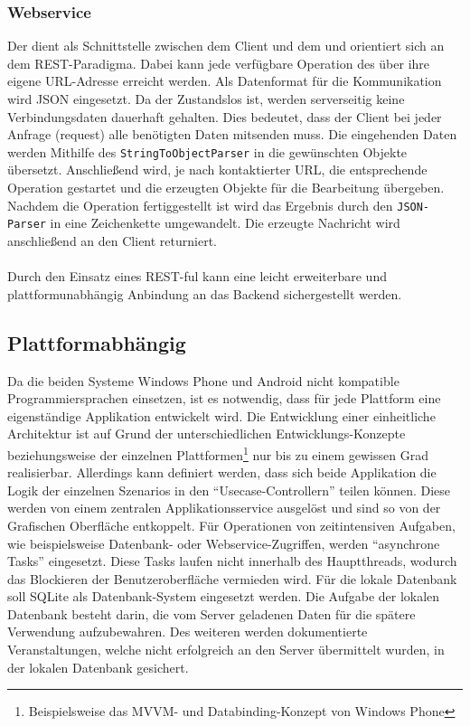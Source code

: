 \documentclass[Bachelorarbeit.tex]{subfiles}
\begin{document}
\subsubsection*{Webservice}
\label{subsub:webservice}
Der  dient als Schnittstelle zwischen dem Client und dem  und orientiert sich an dem \ac{REST}-Paradigma. 
Dabei kann jede verfügbare Operation des  über ihre eigene \ac{URL}-Adresse erreicht werden.
Als Datenformat für die Kommunikation wird \ac{JSON} eingesetzt.
Da der  Zustandslos ist, werden serverseitig keine Verbindungsdaten dauerhaft gehalten.
Dies bedeutet, dass der Client bei jeder Anfrage (request) alle benötigten Daten mitsenden muss.
Die eingehenden Daten werden Mithilfe des \texttt{StringToObjectParser} in die gewünschten Objekte übersetzt.
Anschließend wird, je nach kontaktierter \ac{URL}, die entsprechende Operation gestartet und die erzeugten Objekte für die Bearbeitung übergeben.
Nachdem die Operation fertiggestellt ist wird das Ergebnis durch den \texttt{\ac{JSON}-Parser} in eine Zeichenkette umgewandelt. 
Die erzeugte Nachricht wird anschließend an den Client returniert. \\
\\
Durch den Einsatz eines \ac{REST}-ful  kann eine leicht erweiterbare und plattformunabhängig Anbindung an das Backend sichergestellt werden.

\subsection*{Plattformabhängig}
Da die beiden Systeme Windows Phone und Android nicht kompatible Programmiersprachen einsetzen, ist es notwendig, dass für jede Plattform eine eigenständige Applikation entwickelt wird. 
Die Entwicklung einer einheitliche Architektur ist auf Grund der unterschiedlichen Entwicklungs-Konzepte beziehungsweise der einzelnen Plattformen\footnote{Beispielsweise das \ac{MVVM}- und Databinding-Konzept von Windows Phone} nur bis zu einem gewissen Grad realisierbar. 
Allerdings kann definiert werden, dass sich beide Applikation die Logik der einzelnen Szenarios in den "`Usecase-Controllern"' teilen können.
Diese werden von einem zentralen Applikationsservice ausgelöst und sind so von der Grafischen Oberfläche entkoppelt. 
Für Operationen von zeitintensiven Aufgaben, wie beispielsweise   Datenbank- oder Webservice-Zugriffen, werden "`asynchrone Tasks"' eingesetzt.
Diese Tasks laufen nicht innerhalb des Hauptthreads, wodurch das Blockieren der Benutzeroberfläche vermieden wird.
Für die lokale Datenbank soll SQLite als Datenbank-System eingesetzt werden. 
Die Aufgabe der lokalen Datenbank besteht darin, die vom Server geladenen Daten für die  spätere Verwendung aufzubewahren. 
Des weiteren werden dokumentierte Veranstaltungen, welche nicht erfolgreich an den Server übermittelt wurden, in der lokalen Datenbank gesichert.
\end{document}
